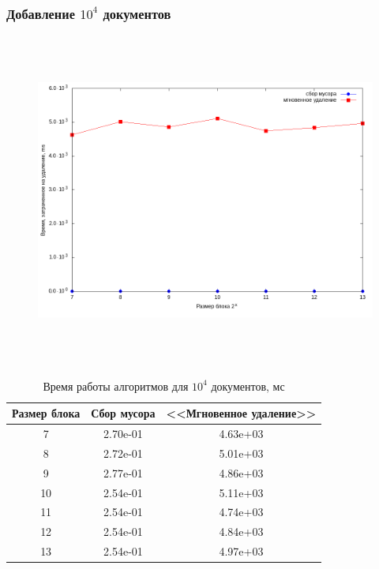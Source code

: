 \subsubsection{Добавление $10^4$ документов}
\begin{figure}[H]
\includegraphics[width=\linewidth, height=11cm]{fig/time_1e4.png}
\end{figure}

\begin{table}[H]
      \caption{Время работы алгоритмов для $10^4$ документов, мс}
      \centering
      \small
      \singlespacing
      \begin{tabular}{|c|c|c|}
            \hline
            Размер блока & Сбор мусора                & <<Мгновенное удаление>> \\ \hline \hline
            7            & 2.70e-01	                  & 4.63e+03              \\ \hline
            8            & 2.72e-01	                  & 5.01e+03              \\ \hline
            9            & 2.77e-01	                  & 4.86e+03              \\ \hline
            10           & 2.54e-01                   & 5.11e+03              \\ \hline
            11           & 2.54e-01                   & 4.74e+03              \\ \hline
            12           & 2.54e-01	                  & 4.84e+03              \\ \hline
            13           & 2.54e-01	                  & 4.97e+03              \\ \hline
\end{tabular}
\end{table}

